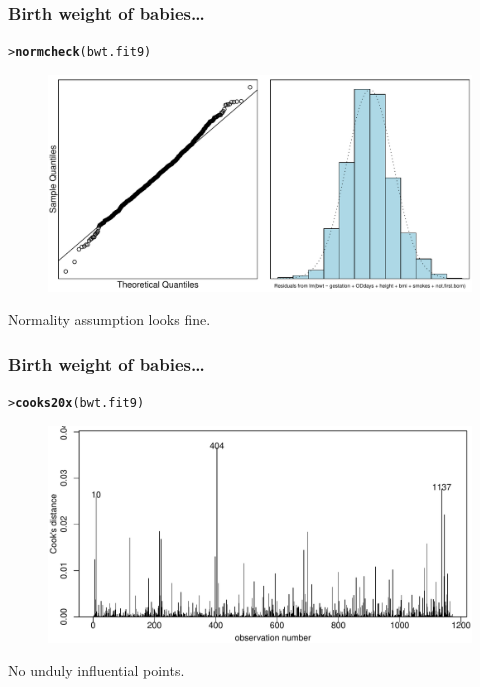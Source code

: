 \documentclass{beamer}\usepackage[]{graphicx}\usepackage[]{xcolor}
\makeatletter
\newcommand{\hlstd}[1]{\textcolor[rgb]{0.345,0.345,0.345}{#1}}%
\newcommand{\hlkwd}[1]{\textcolor[rgb]{0.737,0.353,0.396}{\textbf{#1}}}%
\newenvironment{kframe}{%
 \def\at@end@of@kframe{}%
 \ifinner\ifhmode%
  \def\at@end@of@kframe{\end{minipage}}%
  \begin{minipage}{\columnwidth}%
 \fi\fi%
 \def\FrameCommand##1{\hskip\@totalleftmargin \hskip-\fboxsep
 \colorbox{shadecolor}{##1}\hskip-\fboxsep
     \hskip-\linewidth \hskip-\@totalleftmargin \hskip\columnwidth}%
 \MakeFramed {\advance\hsize-\width
   \@totalleftmargin\z@ \linewidth\hsize
   \@setminipage}}%
 {\par\unskip\endMakeFramed%
 \at@end@of@kframe}
\newenvironment{knitrout}{}{} %
\makeatother
\begin{document}
\begin{frame}[fragile]
\frametitle{Birth weight of babies\ldots}
\begin{knitrout}\scriptsize
{}\color{fgcolor}\begin{kframe}
\begin{alltt}
\hlstd{> }\hlkwd{normcheck}\hlstd{(bwt.fit9)}
\end{alltt}
\end{kframe}
\end{knitrout}



\begin{figure}
  \centering
  \includegraphics[scale=0.5]{figure/RC-H10-052}
\end{figure}

Normality assumption looks fine.
\end{frame}


\begin{frame}[fragile]
\frametitle{Birth weight of babies\ldots}
\begin{knitrout}\scriptsize
{}\color{fgcolor}\begin{kframe}
\begin{alltt}
\hlstd{> }\hlkwd{cooks20x}\hlstd{(bwt.fit9)}
\end{alltt}
\end{kframe}
\end{knitrout}



\begin{figure}
  \centering
  \includegraphics[scale=0.5]{figure/RC-H10-054}
\end{figure}

No unduly influential points.

\end{frame}
\end{document}
